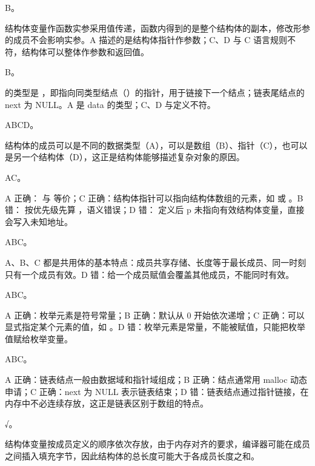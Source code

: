\documentclass[a4paper,11pt]{article}
\begin{document}
\q B。\begin{analysis}结构体变量作函数实参采用值传递，函数内得到的是整个结构体的副本，修改形参的成员不会影响实参。A 描述的是结构体指针作参数；C、D 与 C 语言规则不符，结构体可以整体作参数和返回值。\end{analysis}

\q B。\begin{analysis} 的类型是 ，即指向同类型结点（）的指针，用于链接下一个结点；链表尾结点的 next 为 NULL。A 是 data 的类型；C、D 与定义不符。\end{analysis}


\q ABCD。\begin{analysis}结构体的成员可以是不同的数据类型（A），可以是数组（B）、指针（C），也可以是另一个结构体（D），这正是结构体能够描述复杂对象的原因。\end{analysis}

\q AC。\begin{analysis}A 正确： 与  等价；C 正确：结构体指针可以指向结构体数组的元素，如  或 。B 错： 按优先级先算 ，语义错误；D 错： 定义后 p 未指向有效结构体变量，直接  会写入未知地址。\end{analysis}

\q ABC。\begin{analysis}A、B、C 都是共用体的基本特点：成员共享存储、长度等于最长成员、同一时刻只有一个成员有效。D 错：给一个成员赋值会覆盖其他成员，不能同时有效。\end{analysis}

\q ABC。\begin{analysis}A 正确：枚举元素是符号常量；B 正确：默认从 0 开始依次递增；C 正确：可以显式指定某个元素的值，如 。D 错：枚举元素是常量，不能被赋值，只能把枚举值赋给枚举变量。\end{analysis}

\q ABC。\begin{analysis}A 正确：链表结点一般由数据域和指针域组成；B 正确：结点通常用 malloc 动态申请；C 正确：next 为 NULL 表示链表结束；D 错：链表结点通过指针链接，在内存中不必连续存放，这正是链表区别于数组的特点。\end{analysis}


\q √。\begin{analysis}结构体变量按成员定义的顺序依次存放，由于内存对齐的要求，编译器可能在成员之间插入填充字节，因此结构体的总长度可能大于各成员长度之和。\end{analysis}
\end{document}
